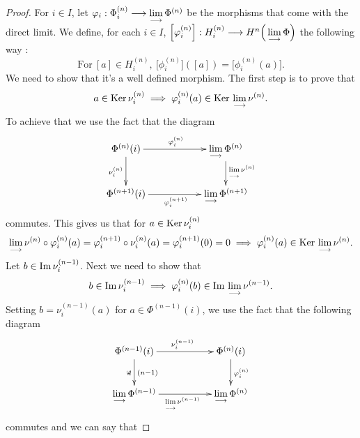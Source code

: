 \documentclass[11pt, a4paper, twoside]{article}
\begin{document}
\begin{proof}
    For $i\in I$, let $\varphi_i:\Phi^{(n)}_i\longrightarrow\lim\limits_{\longrightarrow}\Phi^{(n)}$ be the morphisms that come with the direct limit.
    We define, for each $i\in I$,  $\Big[\varphi_i^{(n)}\Big]:H^{(n)}_i\longrightarrow H^n\Big(\lim\limits_{\longrightarrow}\Phi\Big)$ the following way : 
    \begin{displaymath}
        \mathrm{For}\ [a]\in H^{(n)}_i,\ \Big[\phi_i^{(n)}\Big]([a])=\Big[\phi_i^{(n)}(a)\Big].
    \end{displaymath}
    We need to show that it's a well defined morphism. The first step is to prove that 
    \begin{displaymath}
        a\in\mathrm{Ker}\thinspace\nu^{(n)}_i\implies\varphi^{(n)}_i(a)\in\mathrm{Ker}\thinspace\lim\limits_{\longrightarrow}\nu^{(n)}.
    \end{displaymath}
    To achieve that we use the fact that the diagram 
    \begin{displaymath}
        \xymatrix{
        \Phi^{(n)}(i)\ar[rr]^{\phi_i^{(n)}}\ar[d]_{\nu^{(n)}_i} & & \lim\limits_{\ra}\Phi^{(n)}\ar[d]^{\lim\limits_{\ra}\nu^{(n)}}\\
        \Phi^{(n+1)}(i)\ar[rr]_{\phi_i^{(n+1)}} & & \lim\limits_{\ra}\Phi^{(n+1)}
        }
    \end{displaymath}
    commutes. This gives us that for $a\in\mathrm{Ker}\thinspace\nu^{(n)}_i$
    \begin{displaymath}
        \lim\limits_{\longrightarrow}\nu^{(n)}\circ\varphi_i^{(n)}(a)=\varphi^{(n+1)}_i\circ\nu^{(n)}_i(a)=\varphi_i^{(n+1)}(0)=0\implies\varphi^{(n)}_i(a)\in\mathrm{Ker}\thinspace\lim\limits_{\longrightarrow}\nu^{(n)}.
    \end{displaymath}
    Let $b\in\mathrm{Im}\thinspace\nu^{(n-1)}_i$. Next we need to show that   
    \begin{displaymath}
        b\in\mathrm{Im}\thinspace\nu^{(n-1)}_i\implies\varphi^{(n)}_i(b)\in\mathrm{Im}\thinspace\lim\limits_{\longrightarrow}\nu^{(n-1)}.
    \end{displaymath}
    Setting $b=\nu^{(n-1)}_i(a)$ for $a\in\Phi^{(n-1)}(i)$, we use the fact that the following diagram 
    \begin{displaymath}
        \xymatrix{
            \Phi^{(n-1)}(i)\ar[rr]^{\nu^{(n-1)}_i}\ar[d]_\phi^{(n-1)}_i & & \Phi^{(n)}(i)\ar[d]^{\phi_i^{(n)}}\\
            \lim\limits_{\ra}\Phi^{(n-1)}\ar[rr]_{\lim\limits_{\ra}\nu^{(n-1)}} && \lim\limits_{\ra}\Phi^{(n)}
        }
    \end{displaymath}
    commutes and we can say that 

\end{proof}
\end{document}
